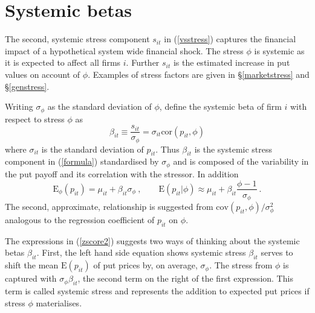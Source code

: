\documentclass[12pt]{article}
\newcommand{\E}{\mathrm{E}}
\newcommand{\cov}{\mathrm{cov}}
\newcommand{\Es}{\E_\phi}
\newcommand{\cor}{\mathrm{cor}}
\newcommand{\eref}[1]{(\ref{#1})}
\newcommand{\sref}[1]{\S\ref{#1}}
\newcommand{\cq}{\ , \qquad}
\newcommand{\be}[1]{\begin{equation}\label{#1}}
\newcommand{\ee}{\end{equation}}
\begin{document}

\section{Systemic betas}

The second, systemic stress component $s_{it}$ in  \eref{vsstress}  captures the financial impact of a  hypothetical system wide financial shock.   The stress $\phi$ is systemic as it is expected to affect all firms $i$.  Further $s_{it}$ is the estimated   increase in put values on account of  $\phi$.   Examples of stress factors are given in \sref{marketstress} and \sref{genstress}.


Writing  $\sigma_{\phi}$ as the standard deviation of $\phi$,  define the systemic beta of firm $i$ with respect to stress $\phi$ as
\be{zscore}
\beta_{it}\equiv \frac{s_{it}}{\sigma_\phi} = \sigma_{it}\cor(p_{it},\phi)
\ee
where $\sigma_{it}$ is the standard deviation of $p_{it}$.   Thus $\beta_{it}$ is the systemic stress component in \eref{formula} standardised by $\sigma_\phi$ and is composed of the variability in the put payoff and its correlation with the stressor. In addition
\be{zscore2}
\Es(p_{it})  = \mu_{it} + \beta_{it}\sigma_\phi\cq \E(p_{it}|\phi) \approx \mu_{it} + \beta_{it}\frac{\phi-1}{\sigma_\phi}\ .
\ee
The second, approximate, relationship is suggested from   $\cov(p_{it},\phi)/\sigma^2_\phi$ analogous to the regression coefficient of $p_{it}$ on $\phi$.

The expressions in \eref{zscore2} suggests two ways of  thinking about the  systemic betas  $\beta_{it}$.   First, the left hand side equation shows systemic stress $\beta_{it}$ serves to shift the mean $\E(p_{it})$ of put prices  by, on average, $\sigma_\phi$.    The stress from $\phi$ is captured with $\sigma_\phi\beta_{it}$, the second term on the right of the first expression.   This term is called systemic stress and represents the addition to expected put prices if stress $\phi$ materialises.
\end{document}
